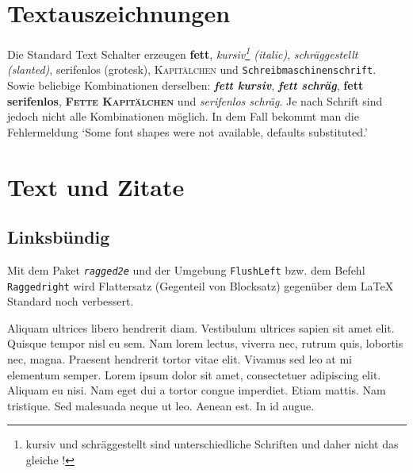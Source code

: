 \newcommand{\env}[1]{\texttt{#1}}
\newcommand{\command}[1]{\texttt{#1}}
\newcommand{\package}[1]{\texttt{\itshape#1}}
\newcommand{\engl}[1]{(engl: \textit{#1})\xspace}


\section{Textauszeichnungen}

Die Standard Text Schalter erzeugen
\textbf{fett},
\textit{kursiv\footnote{kursiv und schräggestellt sind unterschiedliche Schriften und daher nicht das gleiche !} (italic)},
\textsl{schräggestellt (slanted)},
\textsf{serifenlos (grotesk)},
\textsc{Kapitälchen} und
\texttt{Schreibmaschinenschrift}.
Sowie beliebige Kombinationen derselben:
\textit{\textbf{fett kursiv}},
\textsl{\textbf{fett schräg}},
\textsf{\textbf{fett serifenlos}},
\textsc{\textbf{Fette Kapitälchen}}
und
\textsl{\textsf{serifenlos schräg}}. Je nach Schrift sind jedoch nicht alle Kombinationen möglich. In dem Fall bekommt man die Fehlermeldung `Some font shapes were not available, defaults substituted.'


\section{Text und Zitate}
\subsection{Linksbündig}
%
Mit dem Paket \package{ragged2e} und der Umgebung \env{FlushLeft} bzw. dem Befehl \command{Raggedright} wird Flattersatz (Gegenteil von Blocksatz) gegenüber dem \LaTeX{} Standard noch verbessert.

\begin{FlushLeft}
Aliquam ultrices libero hendrerit diam. Vestibulum ultrices sapien sit amet elit. Quisque tempor nisl eu sem. Nam lorem lectus, viverra nec, rutrum quis, lobortis nec, magna. Praesent hendrerit tortor vitae elit. Vivamus sed leo at mi elementum semper. Lorem ipsum dolor sit amet, consectetuer adipiscing elit. Aliquam eu nisi. Nam eget dui a tortor congue imperdiet. Etiam mattis. Nam tristique. Sed malesuada neque ut leo. Aenean est. In id augue.
\end{FlushLeft}
